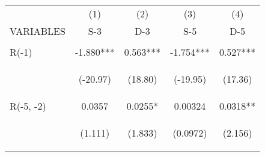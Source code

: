 \documentclass[]{standalone}
\begin{document}
\begin{tabular}{lcccc} \hline
                     & (1)                                            & (2)                                            & (3)                                            & (4)                                            \\
    VARIABLES        & S-3                                            & D-3                                            & S-5                                            & D-5                                            \\ \hline
    \vspace{4pt}     & \begin{footnotesize}\end{footnotesize}         & \begin{footnotesize}\end{footnotesize}         & \begin{footnotesize}\end{footnotesize}         & \begin{footnotesize}\end{footnotesize}         \\
    R(-1)            & -1.880***                                      & 0.563***                                       & -1.754***                                      & 0.527***                                       \\
    \vspace{4pt}     & \begin{footnotesize}(-20.97)\end{footnotesize} & \begin{footnotesize}(18.80)\end{footnotesize}  & \begin{footnotesize}(-19.95)\end{footnotesize} & \begin{footnotesize}(17.36)\end{footnotesize}  \\
    R(-5, -2)        & 0.0357                                         & 0.0255*                                        & 0.00324                                        & 0.0318**                                       \\
    \vspace{4pt}     & \begin{footnotesize}(1.111)\end{footnotesize}  & \begin{footnotesize}(1.833)\end{footnotesize}  & \begin{footnotesize}(0.0972)\end{footnotesize} & \begin{footnotesize}(2.156)\end{footnotesize}  \\

\end{tabular}
\end{document}
